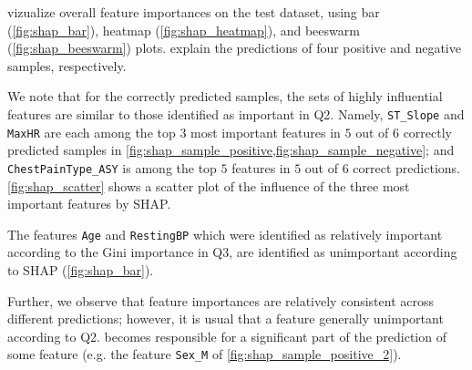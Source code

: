  vizualize overall feature importances on the test dataset, using bar (\autoref{fig:shap_bar}), heatmap (\autoref{fig:shap_heatmap}), and beeswarm (\autoref{fig:shap_beeswarm}) plots.  explain the predictions of four positive and negative samples, respectively.

We note that for the correctly predicted samples, the sets of highly influential features are similar to those identified as important in Q2. Namely, \texttt{ST\_Slope} and \texttt{MaxHR} are each among the top 3 most important features in $5$ out of $6$ correctly predicted samples in \cref{fig:shap_sample_positive,fig:shap_sample_negative}; and \texttt{ChestPainType\_ASY} is among the top $5$ features in $5$ out of $6$ correct predictions. \autoref{fig:shap_scatter} shows a scatter plot of the influence of the three most important features by SHAP.

The features \texttt{Age} and \texttt{RestingBP} which were identified as relatively important according to the Gini importance in Q3, are identified as unimportant according to SHAP (\autoref{fig:shap_bar}).

Further, we observe that feature importances are relatively consistent across different predictions; however, it is usual that a feature generally unimportant according to Q2. becomes responsible for a significant part of the prediction of some feature (e.g. the feature \texttt{Sex\_M} of \autoref{fig:shap_sample_positive_2}).

